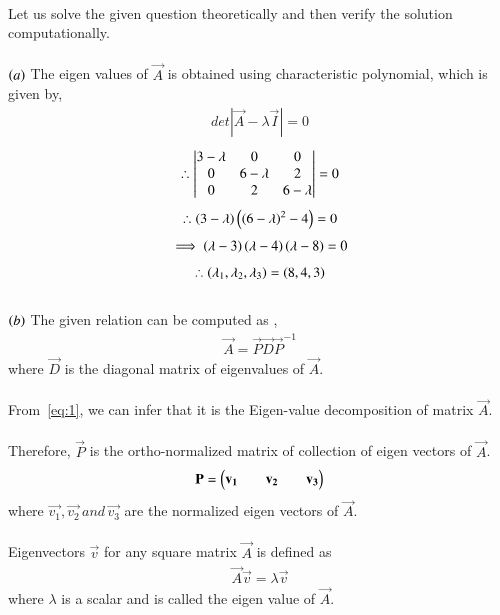 \documentclass[journal]{IEEEtran}
\begin{document}
\solution \\
Let us solve the given question theoretically and then verify the solution computationally.\\
\\
$\left(a\right)$ The eigen values of $\vec{A}$ is obtained using characteristic polynomial, which is given by,
\begin{align}
    det|\vec{A}-\lambda\vec{I}|=0
\end{align}
\begin{align}
    \therefore \begin{vmatrix}3-\lambda&0&0\\0&6-\lambda&2\\0&2&6-\lambda\end{vmatrix}=0
\end{align}
\begin{align}
    \therefore \left(3-\lambda\right)\left(\left(6-\lambda\right)^2-4\right)=0
\end{align}
\begin{align}
    \implies  \left(\lambda-3\right)\left(\lambda-4\right)\left(\lambda-8\right)=0
\end{align}
\newpage
\vspace*{0.25cm}
\begin{align}
    \therefore \left(\lambda_1,\lambda_2,\lambda_3\right)=\left(8,4,3\right)
\end{align}
\\
$\left(b\right)$ The given relation can be computed as ,
\begin{align}
    \vec{A}=\vec{P}\vec{D}\vec{P}^{-1} \label{eq:1}
\end{align}
where $\vec{D}$ is the diagonal matrix of eigenvalues of $\vec{A}$.\\
\\
From~\eqref{eq:1}, we can infer that it is the Eigen-value decomposition of matrix $\vec{A}$.\\
\\
Therefore, $\vec{P}$ is the ortho-normalized matrix of collection of eigen vectors of $\vec{A}$.
\begin{align}
    \mathbf{P}=\begin{pmatrix}\mathbf{v_1}&&\mathbf{v_2}&&\mathbf{v_3}\end{pmatrix}
\end{align}
where $\vec{v_1},\vec{v_2} \,and\, \vec{v_3}$ are the normalized eigen vectors of $\vec{A}$.\\
\\
Eigenvectors $\vec{v}$ for any square matrix $\vec{A}$ is defined as 
\begin{align}
    \vec{A}\vec{v}=\lambda\vec{v}
\end{align}
where $\lambda$ is a scalar and is called the eigen value of $\vec{A}$.
\end{document}

